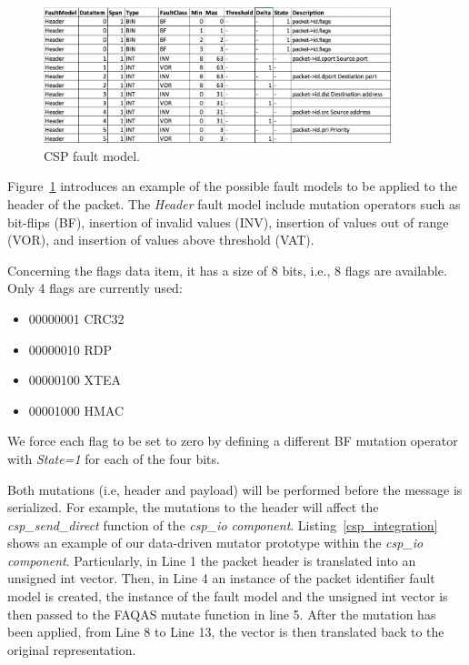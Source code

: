 \begin{figure}[h]
  \centering
    \includegraphics[width=0.9\textwidth]{images/FaultModelCSP_temp}
      \caption{CSP fault model.}
      \label{fig:csp_faultmodel}
\end{figure}

Figure~\ref{fig:csp_faultmodel} introduces an example of the possible fault models to be applied to the  header of the packet.
The \emph{Header} fault model include mutation operators such as bit-flips (BF), insertion of invalid values (INV), insertion of values out of range (VOR), and insertion of values above threshold (VAT).

Concerning the flags data item, it has a size of 8 bits, i.e., 8 flags are available. Only 4 flags are currently used:
\begin{itemize}
\item 00000001              CRC32
\item 00000010             RDP
\item 00000100             XTEA
\item 00001000             HMAC
\end{itemize}
We force each flag to be set to zero by defining a different BF mutation operator with \emph{State=1} for each of the four bits.



Both mutations (i.e, header and payload) will be performed before the message is serialized. 
For example, the mutations to the header will affect the \emph{csp\_send\_direct} function of the \emph{csp\_io component}. 
Listing~\ref{csp_integration} shows an example of our data-driven mutator prototype within the \emph{csp\_io component}. 
Particularly, in Line 1 the packet header is translated into an unsigned int vector. 
Then, in Line 4 an instance of the packet identifier fault model is created, 
the instance of the fault model and the unsigned int vector is then passed to the FAQAS mutate function in line 5.
After the mutation has been applied, from Line 8 to Line 13, the vector is then translated back to the original representation.
 


